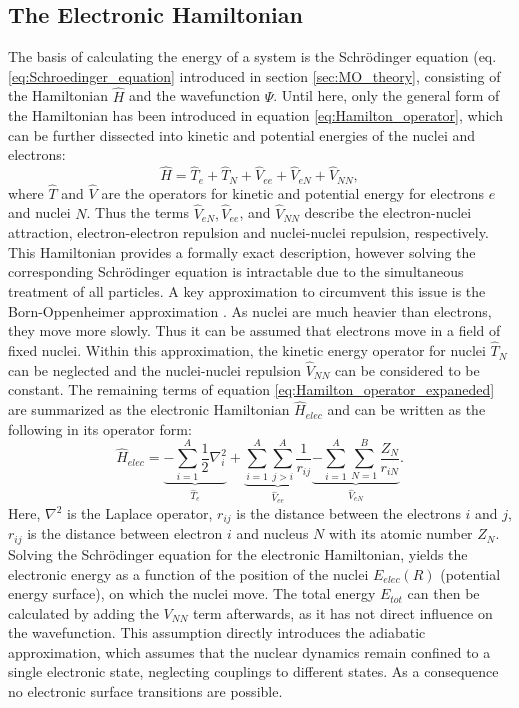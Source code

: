 \subsection{The Electronic Hamiltonian}
\label{sec:Hartree_Fock}
The basis of calculating the energy of a system is the Schr\"odinger equation (eq. \ref{eq:Schroedinger_equation} introduced in section \ref{sec:MO_theory}, consisting of the Hamiltonian $\hat{H}$ and the wavefunction $\Psi$. Until here, only the general form of the Hamiltonian has been introduced in equation \ref{eq:Hamilton_operator}, which can be further dissected into kinetic and potential energies of the nuclei and electrons:
\begin{equation}
    \hat{H} = \hat{T}_{e} + \hat{T}_{N} + \hat{V}_{ee} + \hat{V}_{eN} + \hat{V}_{NN},
    \label{eq:Hamilton_operator_expaneded}
\end{equation}
where $\hat{T}$ and $\hat{V}$ are the operators for kinetic and potential energy for electrons $e$ and nuclei $N$. Thus the terms $ \hat{V}_{eN}, \hat{V}_{ee}$, and $\hat{V}_{NN}$ describe the electron-nuclei attraction, electron-electron repulsion and nuclei-nuclei repulsion, respectively. This Hamiltonian provides a formally exact description, however solving the corresponding Schr\"odinger equation is intractable due to the simultaneous treatment of all particles. A key approximation to circumvent this issue is the Born-Oppenheimer approximation \cite{born_oppenheimer1927}. As nuclei are much heavier than electrons, they move more slowly. Thus it can be assumed that electrons move in a field of fixed nuclei. Within this approximation, the kinetic energy operator for nuclei $\hat{T}_{N}$ can be neglected and the nuclei-nuclei repulsion $\hat{V}_{NN}$ can be considered to be constant. The remaining terms of equation \ref{eq:Hamilton_operator_expaneded} are summarized as the electronic Hamiltonian $\hat{H}_{elec}$ and can be written as the following in its operator form:
\begin{equation}
    \hat{H}_{elec} = \underbrace{-\sum_{i = 1}^{A}\frac{1}{2}\nabla^{2}_{i}}_{\hat{T}_{e}}  + \underbrace{\sum_{i=1}^{A}\sum_{j>i}^{A}\frac{1}{r_{ij}}}_{\hat{V}_{ee}}  \underbrace{-\sum_{i=1}^{A}\sum_{N=1}^{B}\frac{Z_{N}}{r_{iN}}}_{\hat{V}_{eN}}.
    \label{eq:Hamilton_operator_electronic}
\end{equation}
Here, $\nabla^{2}$ is the Laplace operator, $r_{ij}$ is the distance between the electrons $i$ and $j$, $r_{ij}$ is the distance between electron $i$ and nucleus $N$ with its atomic number $Z_{N}$. Solving the Schr\"odinger equation for the electronic Hamiltonian, yields the electronic energy as a function of the position of the nuclei $E_{elec}(R)$ (potential energy surface), on which the nuclei move. The total energy $E_{tot}$ can then be calculated by adding the $V_{NN}$ term afterwards, as it has not direct influence on the wavefunction. This assumption directly introduces the adiabatic approximation, which assumes that the nuclear dynamics remain confined to a single electronic state, neglecting couplings to different states. As a consequence no electronic surface transitions are possible.

